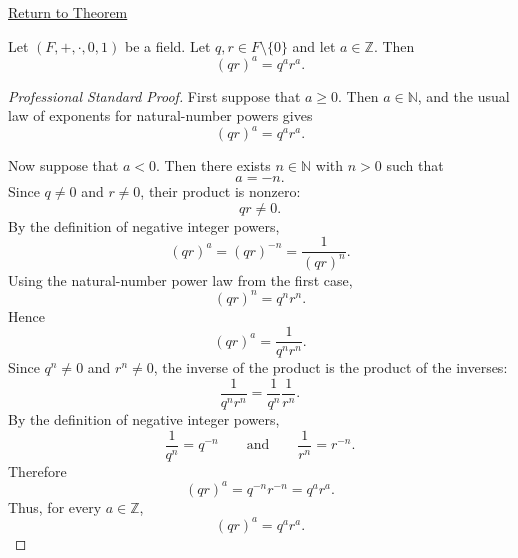 \newpage
{}
\label{prf:power-of-product-in-field}

\begin{remark*}[Return]
\hyperref[thm:power-of-product-in-field]{Return to Theorem}
\end{remark*}

\begin{theorem*}
Let $(F,+,\cdot,0,1)$ be a field. Let $q,r\in F\setminus\{0\}$ and let
$a\in\mathbb{Z}$. Then
\[
(qr)^a=q^a r^a.
\]
\end{theorem*}

\begin{proof}[Professional Standard Proof]
\LRAProofBodyStart
First suppose that $a\ge 0$. Then $a\in\mathbb{N}$, and the usual
law of exponents for natural-number powers gives
\[
(qr)^a=q^a r^a.
\]

Now suppose that $a<0$. Then there exists $n\in\mathbb{N}$ with
$n>0$ such that
\[
a=-n.
\]
Since $q\neq 0$ and $r\neq 0$, their product is nonzero:
\[
qr\neq 0.
\]
By the definition of negative integer powers,
\[
(qr)^a=(qr)^{-n}=\frac{1}{(qr)^n}.
\]
Using the natural-number power law from the first case,
\[
(qr)^n=q^n r^n.
\]
Hence
\[
(qr)^a=\frac{1}{q^n r^n}.
\]
Since $q^n\neq 0$ and $r^n\neq 0$, the inverse of the product is the
product of the inverses:
\[
\frac{1}{q^n r^n}=\frac{1}{q^n}\frac{1}{r^n}.
\]
By the definition of negative integer powers,
\[
\frac{1}{q^n}=q^{-n}
\qquad\text{and}\qquad
\frac{1}{r^n}=r^{-n}.
\]
Therefore
\[
(qr)^a=q^{-n}r^{-n}=q^a r^a.
\]
Thus, for every $a\in\mathbb{Z}$,
\[
(qr)^a=q^a r^a.
\]
\end{proof}

